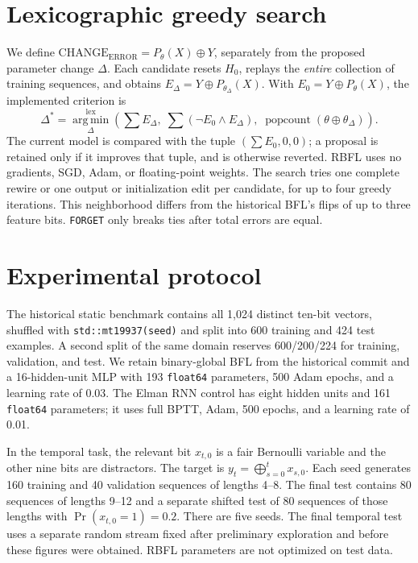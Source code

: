 \documentclass[10pt,a4paper]{article}
\newcommand{\CE}{\mathrm{CHANGE}_{\mathrm{ERROR}}}
\begin{document}
\section{Lexicographic greedy search}
We define $\CE=P_{\theta}(X)\oplus Y$, separately from the proposed parameter change $\Delta$. Each candidate resets $H_0$, replays the \emph{entire} collection of training sequences, and obtains $E_\Delta=Y\oplus P_{\theta_\Delta}(X)$. With $E_0=Y\oplus P_\theta(X)$, the implemented criterion is
\begin{equation}
\Delta^*=\operatorname*{arg\,min}^{\mathrm{lex}}_{\Delta}
\left(\sum E_\Delta,\;\sum(\neg E_0\land E_\Delta),\;
\operatorname{popcount}(\theta\oplus\theta_\Delta)\right).
\end{equation}
The current model is compared with the tuple $(\sum E_0,0,0)$; a proposal is retained only if it improves that tuple, and is otherwise reverted. RBFL uses no gradients, SGD, Adam, or floating-point weights. The search tries one complete rewire or one output or initialization edit per candidate, for up to four greedy iterations. This neighborhood differs from the historical BFL's flips of up to three feature bits. \texttt{FORGET} only breaks ties after total errors are equal.

\section{Experimental protocol}
The historical static benchmark contains all 1,024 distinct ten-bit vectors, shuffled with \texttt{std::mt19937(seed)} and split into 600 training and 424 test examples. A second split of the same domain reserves 600/200/224 for training, validation, and test. We retain binary-global BFL from the historical commit and a 16-hidden-unit MLP with 193 \texttt{float64} parameters, 500 Adam epochs, and a learning rate of 0.03. The Elman RNN control has eight hidden units and 161 \texttt{float64} parameters; it uses full BPTT, Adam, 500 epochs, and a learning rate of 0.01.

In the temporal task, the relevant bit $x_{t,0}$ is a fair Bernoulli variable and the other nine bits are distractors. The target is $y_t=\bigoplus_{s=0}^{t}x_{s,0}$. Each seed generates 160 training and 40 validation sequences of lengths 4--8. The final test contains 80 sequences of lengths 9--12 and a separate shifted test of 80 sequences of those lengths with $\Pr(x_{t,0}=1)=0.2$. There are five seeds. The final temporal test uses a separate random stream fixed after preliminary exploration and before these figures were obtained. RBFL parameters are not optimized on test data.
\end{document}
